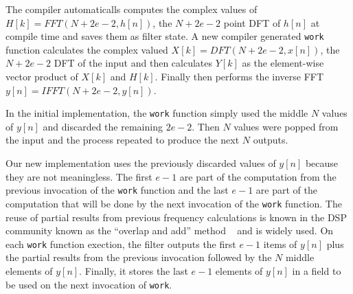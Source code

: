 The compiler automaticalls computes the complex values of $H[k]=FFT(N+2e-2,h[n])$,
the $N+2e-2$ point DFT of $h[n]$ at compile time and saves them as filter state. 
A new compiler generated {\tt work} function calculates the complex valued $X[k]=DFT(N+2e-2,x[n])$, 
the $N+2e-2$ DFT of the input and then calculates $Y[k]$ as the element-wise vector 
product of $X[k]$ and $H[k]$. Finally then performs the inverse FFT $y[n]=IFFT(N+2e-2,y[n])$.

In the initial implementation, the {\tt work} function simply used the middle $N$ 
values of $y[n]$ and discarded the remaining $2e-2$. Then $N$ values were popped 
from the input and the process repeated to produce the next $N$ outputs.

Our new implementation uses the previously discarded values of $y[n]$ because they are not
meaningless. The first $e-1$ are part of the computation from the previous invocation of the 
{\tt work} function and the last $e-1$ are part of the computation that will be done
by the next invocation of the {\tt work} function. 
The reuse of partial results from previous frequency calculations is  known in the DSP community known as 
the ``overlap and add'' method ~\cite{oppenheim-discrete} and is widely used.
On each {\tt work} function exection, the filter outputs the first $e-1$ items 
of $y[n]$ plus the partial results from the previous invocation followed 
by the $N$ middle elements of $y[n]$. Finally, it stores the last $e-1$ elements 
of $y[n]$ in a field to be used on the next invocation of {\tt work}.


